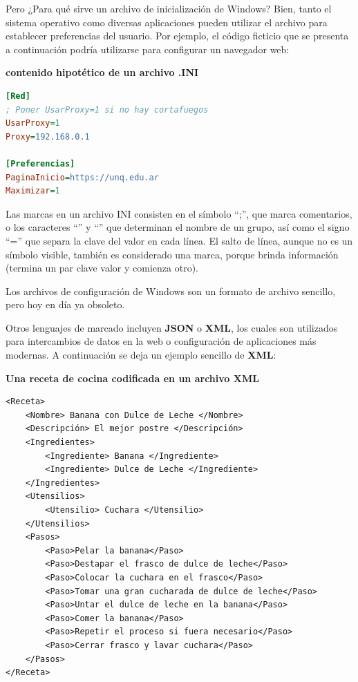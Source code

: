 Pero ¿Para qué sirve un archivo de inicialización de Windows? Bien, tanto
el sistema operativo como diversas aplicaciones pueden utilizar el archivo
para establecer preferencias del usuario. Por ejemplo, el código
ficticio que se presenta a continuación podría utilizarse para configurar un
navegador web:

\begin{example}

    \textbf{contenido hipotético de un archivo .INI}

    \begin{lstlisting}[language=ini]
[Red]
; Poner UsarProxy=1 si no hay cortafuegos
UsarProxy=1
Proxy=192.168.0.1

[Preferencias]
PaginaInicio=https://unq.edu.ar
Maximizar=1
    \end{lstlisting}
\end{example}

Las marcas en un archivo INI consisten en el símbolo ``;'', que marca comentarios,
o los caracteres ``\lbrack'' y ``\rbrack'' que determinan el nombre de un grupo,
así como el signo ``='' que separa la clave del valor en cada línea. El salto
de línea, aunque no es un símbolo visible, también es considerado una marca,
porque brinda información (termina un par clave valor y comienza otro).

Los archivos de configuración de Windows son un formato de archivo sencillo,
pero hoy en día ya obsoleto.

Otros lenguajes de marcado incluyen \textbf{JSON} o \textbf{XML}, los cuales
son utilizados para intercambios de datos en la web o configuración de aplicaciones
más modernas. A continuación se deja un ejemplo sencillo de \textbf{XML}:\autocite{marshal_2000}

\begin{example}
    
    \textbf{Una receta de cocina codificada en un archivo XML}


    \begin{lstlisting}[language=XHTML]
<Receta>
    <Nombre> Banana con Dulce de Leche </Nombre>
    <Descripción> El mejor postre </Descripción>
    <Ingredientes>
        <Ingrediente> Banana </Ingrediente>
        <Ingrediente> Dulce de Leche </Ingrediente>
    </Ingredientes>
    <Utensilios>
        <Utensilio> Cuchara </Utensilio>
    </Utensilios>
    <Pasos>
        <Paso>Pelar la banana</Paso>
        <Paso>Destapar el frasco de dulce de leche</Paso>
        <Paso>Colocar la cuchara en el frasco</Paso>
        <Paso>Tomar una gran cucharada de dulce de leche</Paso>
        <Paso>Untar el dulce de leche en la banana</Paso>
        <Paso>Comer la banana</Paso>
        <Paso>Repetir el proceso si fuera necesario</Paso>
        <Paso>Cerrar frasco y lavar cuchara</Paso>
    </Pasos>
</Receta>
    \end{lstlisting}

\end{example}

